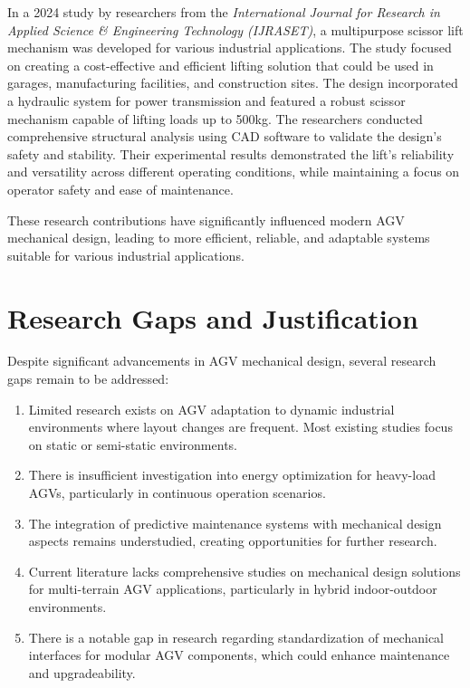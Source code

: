 \documentclass[../../main]{subfiles}
\begin{document}
In a 2024 study by researchers from the \textit{International Journal for Research in Applied Science \& Engineering Technology (IJRASET)}, a multipurpose scissor lift mechanism was developed for various industrial applications. The study focused on creating a cost-effective and efficient lifting solution that could be used in garages, manufacturing facilities, and construction sites. The design incorporated a hydraulic system for power transmission and featured a robust scissor mechanism capable of lifting loads up to 500kg. The researchers conducted comprehensive structural analysis using CAD software to validate the design's safety and stability. Their experimental results demonstrated the lift's reliability and versatility across different operating conditions, while maintaining a focus on operator safety and ease of maintenance.

These research contributions have significantly influenced modern AGV mechanical design, leading to more efficient, reliable, and adaptable systems suitable for various industrial applications.


\section{Research Gaps and Justification}
Despite significant advancements in AGV mechanical design, several
research gaps remain to be addressed:

\begin{enumerate}
\item
  Limited research exists on AGV adaptation to dynamic industrial
  environments where layout changes are frequent. Most existing studies
  focus on static or semi-static environments.
\item
  There is insufficient investigation into energy optimization for
  heavy-load AGVs, particularly in continuous operation scenarios.
\item
  The integration of predictive maintenance systems with mechanical
  design aspects remains understudied, creating opportunities for
  further research.
\item
  Current literature lacks comprehensive studies on mechanical design
  solutions for multi-terrain AGV applications, particularly in hybrid
  indoor-outdoor environments.
\item
  There is a notable gap in research regarding standardization of
  mechanical interfaces for modular AGV components, which could enhance
  maintenance and upgradeability.
\end{enumerate}
\end{document}
